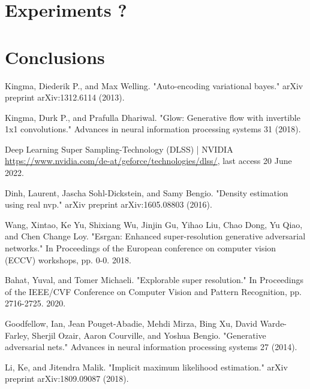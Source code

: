 \documentclass{article}
\begin{document}
\newpage
\section{Experiments ?}\label{sec:eval}
\newpage
\section{Conclusions}\label{sec:conc}


\newpage
\begin{thebibliography}{9}

    Kingma, Diederik P., and Max Welling. "Auto-encoding variational bayes." arXiv preprint arXiv:1312.6114 (2013).

    Kingma, Durk P., and Prafulla Dhariwal. "Glow: Generative flow with invertible 1x1 convolutions." Advances in neural information processing systems 31 (2018).

    Deep Learning Super Sampling-Technology (DLSS) | NVIDIA\\
    \url{https://www.nvidia.com/de-at/geforce/technologies/dlss/}, last access 20 June 2022.
    
    Dinh, Laurent, Jascha Sohl-Dickstein, and Samy Bengio. "Density estimation using real nvp." arXiv preprint arXiv:1605.08803 (2016).

    Wang, Xintao, Ke Yu, Shixiang Wu, Jinjin Gu, Yihao Liu, Chao Dong, Yu Qiao, and Chen Change Loy. "Esrgan: Enhanced super-resolution generative adversarial networks." In Proceedings of the European conference on computer vision (ECCV) workshops, pp. 0-0. 2018.

    Bahat, Yuval, and Tomer Michaeli. "Explorable super resolution." In Proceedings of the IEEE/CVF Conference on Computer Vision and Pattern Recognition, pp. 2716-2725. 2020.

    Goodfellow, Ian, Jean Pouget-Abadie, Mehdi Mirza, Bing Xu, David Warde-Farley, Sherjil Ozair, Aaron Courville, and Yoshua Bengio. "Generative adversarial nets." Advances in neural information processing systems 27 (2014).

    Li, Ke, and Jitendra Malik. "Implicit maximum likelihood estimation." arXiv preprint arXiv:1809.09087 (2018).


\end{thebibliography}
\end{document}
